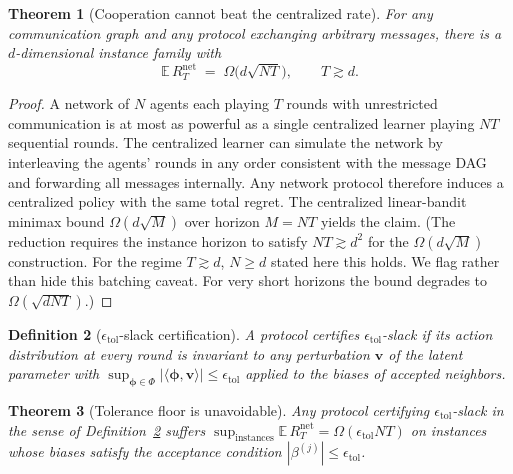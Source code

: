 \documentclass[11pt]{article}
\newtheorem{theorem}{Theorem}[section]
\newtheorem{definition}[theorem]{Definition}
\begin{document}
\begin{theorem}[Cooperation cannot beat the centralized rate]
\label{thm:lower_coop}
For any communication graph and any protocol exchanging arbitrary
messages, there is a $d$-dimensional instance family with
\[
\mathbb E\,R_T^{\mathrm{net}}\;=\;\Omega\bigl(d\sqrt{NT}\bigr),
\qquad T\gtrsim d .
\]
\end{theorem}

\begin{proof}
A network of $N$ agents each playing $T$ rounds with unrestricted
communication is at most as powerful as a single centralized learner
playing $NT$ sequential rounds. The centralized learner can simulate
the network by interleaving the agents' rounds in any order consistent
with the message DAG and forwarding all messages internally.  Any
network protocol therefore induces a centralized policy with the same
total regret.  The centralized linear-bandit minimax bound
$\Omega(d\sqrt{M})$ over horizon $M=NT$ \citep{dani2008} yields the
claim.  (The reduction requires the instance horizon to satisfy
$NT\gtrsim d^2$ for the $\Omega(d\sqrt{M})$ construction. For the
regime $T\gtrsim d$, $N\geq d$ stated here this holds.  We flag rather
than hide this batching caveat. For very short horizons the bound
degrades to $\Omega(\sqrt{dNT})$.)
\end{proof}

\begin{definition}[$\epsilon_{\mathrm{tol}}$-slack certification]
\label{def:slack}
A protocol \emph{certifies $\epsilon_{\mathrm{tol}}$-slack} if its
action distribution at every round is invariant to any perturbation
$\bm v$ of the latent parameter with
$\sup_{\bm\phi\in\Phi}|\langle\bm\phi,\bm v\rangle|
\leq\epsilon_{\mathrm{tol}}$
applied to the biases of accepted neighbors.
\end{definition}

\begin{theorem}[Tolerance floor is unavoidable]\label{thm:lower_tol}
Any protocol certifying $\epsilon_{\mathrm{tol}}$-slack in the sense of
Definition~\ref{def:slack} suffers
$\sup_{\text{instances}}\mathbb E\,R_T^{\mathrm{net}}
=\Omega(\epsilon_{\mathrm{tol}}NT)$
on instances whose biases satisfy the acceptance condition
$|\beta^{(j)}|\leq\epsilon_{\mathrm{tol}}$.
\end{theorem}
\end{document}
